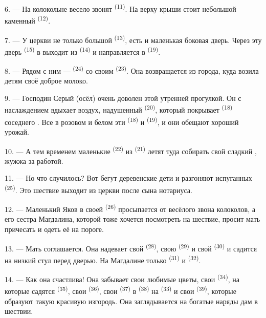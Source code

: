 6. --- На колокольне весело звонят  \textsuperscript{(11)}. На
верху крыши стоит небольшой каменный  \textsuperscript{(12)}.

7. --- У церкви не только большой  \textsuperscript{(13)}, есть и
маленькая боковая дверь. Через эту дверь 
\textsuperscript{(15)} в  выходит из 
\textsuperscript{(14)} и направляется в  \textsuperscript{(19)}.

8. --- Рядом с ним ---  \textsuperscript{(24)} со своим
 \textsuperscript{(23)}. Она возвращается из города, куда возила
детям своё доброе молоко.

\VUsaut{4.0mm}
\VUsaut{3.4mm}

9. --- Господин Серый (осёл) очень доволен этой утренней прогулкой. Он с
наслаждением вдыхает воздух, надушенный  \textsuperscript{(20)},
который покрывает  \textsuperscript{(18)} соседнего
. Все в розовом и белом эти 
\textsuperscript{(18)} и  \textsuperscript{(19)}, и они
обещают хороший урожай.

10. --- А тем временем маленькие  \textsuperscript{(22)} из
 \textsuperscript{(21)} летят туда собирать свой сладкий
, жужжа за работой.

11. --- Но что случилось? Вот бегут деревенские дети и разгоняют
испуганных  \textsuperscript{(25)}. Это шествие выходит из церкви
после  сына нотариуса.

12. --- Маленький Яков в своей  \textsuperscript{(26)}
просыпается от весёлого звона колоколов, а его сестра Магдалина, которой
тоже хочется посмотреть на шествие, просит мать причесать и одеть её на
пороге.

13. --- Мать соглашается. Она надевает свой 
\textsuperscript{(28)}, свою  \textsuperscript{(29)} и свой
 \textsuperscript{(30)} и садится на низкий стул перед дверью.
На Магдалине только  \textsuperscript{(31)} и 
\textsuperscript{(32)}.

14. --- Как она счастлива! Она забывает свои любимые цветы, свои
 \textsuperscript{(34)}, на которые садятся 
\textsuperscript{(35)}, свои  \textsuperscript{(36)}, свои
 \textsuperscript{(37)} в  \textsuperscript{(38)} на
 \textsuperscript{(33)} и свои  \textsuperscript{(39)},
которые образуют такую красивую изгородь. Она заглядывается на богатые
наряды дам в шествии.

